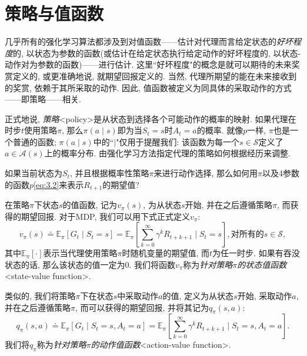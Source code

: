 \section{策略与值函数}\label{sec:3.5}

几乎所有的强化学习算法都涉及到对值函数——估计对代理而言给定状态的\emph{好坏程度}的, 以状态为参数的函数(或估计在给定状态执行给定动作的好坏程度的, 以状态-动作对为参数的函数)——进行估计. 这里``好坏程度"的概念是就可以期待的未来奖赏定义的, 或更准确地说, 就期望回报定义的. 当然, 代理所期望的能在未来接收到的奖赏, 依赖于其所采取的动作. 因此, 值函数被定义为同具体的采取动作的方式——即策略——相关.

正式地说, \emph{策略}<policy>是从状态到选择各个可能动作的概率的映射. 如果代理在时步$t$使用策略$\pi$, 那么$\pi(a \mid s)$即为当$S_t = s$时$A_t = a$的概率. 就像$p$一样, $\pi$也是一个普通的函数; $\pi(a \mid s)$中的``$\mid$"仅用于提醒我们: 该函数为每一个$s \in \mathcal{S}$定义了$a \in \mathcal{A}(s)$上的概率分布. 由强化学习方法指定代理的策略如何根据经历来调整.

\begin{exer}
如果当前状态为$S_t$, 并且根据概率性策略$\pi$来进行动作选择, 那么如何用$\pi$以及4参数的函数$p$\eqref{eq:3.2}来表示$R_{t + 1}$的期望值?
\end{exer}

在策略$\pi$下状态$s$的值函数, 记为$v_\pi(s)$, 为从状态$s$开始, 并在之后遵循策略$\pi$, 而获得的期望回报. 对于MDP, 我们可以用下式正式定义$v_\pi$:
\begin{equation}\label{eq:3.12}
v_\pi(s) \doteq \mathbb{E}_\pi[G_t \mid S_t = s] = \mathbb{E}_\pi \left[ \sum_{k = 0}^{\infty} \gamma^k R_{t + k + 1} \mid S_t = s \right], \text{对所有的}s \in \mathcal{S},
\end{equation}
其中$\mathbb{E}_\pi [\cdot]$表示当代理使用策略$\pi$时随机变量的期望值, 而$t$为任一时步. 如果有吞没状态的话, 那么该状态的值一定为0. 我们将函数$v_\pi$称为\emph{针对策略$\pi$的状态值函数}<state-value function>. 

类似的, 我们将策略$\pi$下在状态$s$中采取动作$a$的值, 定义为从状态$s$开始, 采取动作$a$, 并在之后遵循策略$\pi$, 而可以获得的期望回报, 并将其记为$q_\pi(s, a)$:
\begin{equation}\label{eq:3.13}
q_\pi(s, a) \doteq \mathbb{E}_\pi[G_t \mid S_t = s, A_t = a] = \mathbb{E}_\pi \left[ \sum_{k = 0}^{\infty} \gamma^k R_{t + k + 1} \mid S_t = s, A_t = a \right].
\end{equation}
我们将$q_\pi$称为\emph{针对策略$\pi$的动作值函数}<action-value function>.

